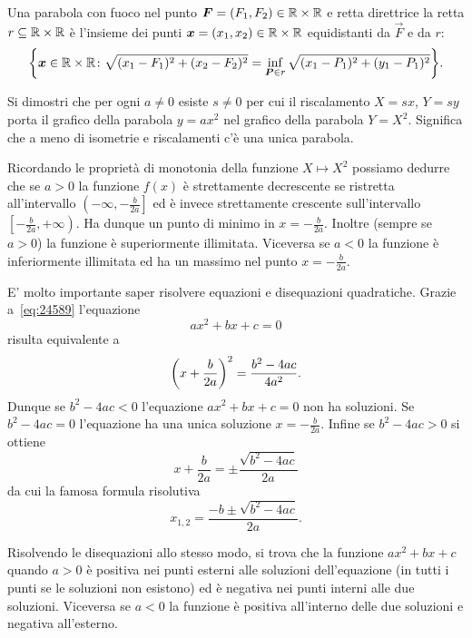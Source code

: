 \begin{definition}[parabola]
  Una parabola con fuoco nel punto $\boldsymbol F=(F_1,F_2)\in {\mathbb R}\times {\mathbb R}$ 
  e retta direttrice 
  la retta $r \subseteq {\mathbb R}\times{\mathbb R}$ 
  è l'insieme dei punti  $\boldsymbol x = (x_1,x_2)\in {\mathbb R}\times{\mathbb R}$ 
  equidistanti da $\vec F$ e da $r$:
  \[
  {\left\{ \boldsymbol x\in {\mathbb R}\times{\mathbb R}\colon 
  \sqrt{(x_1-F_1)^2 + (x_2-F_2)^2} 
  = \inf_{\boldsymbol P\in r}\sqrt{(x_1-P_1)^2+(y_1-P_1)^2}
   \right\}}.
  \]
\end{definition}

\begin{exercise}
  Si dimostri che per ogni $a\neq 0$ esiste $s\neq 0$ 
  per cui il riscalamento $X=sx$, $Y=sy$ porta il grafico della 
  parabola $y=ax^2$ nel grafico della parabola $Y=X^2$.
  Significa che a meno di isometrie e riscalamenti c'è una 
  unica parabola.
\end{exercise}

Ricordando le proprietà di monotonia della funzione $X\mapsto X^2$
possiamo dedurre che se $a>0$ la funzione $f(x)$ è strettamente
decrescente se ristretta all'intervallo 
$\left(-\infty,-\frac b {2a}\right]$ ed è invece strettamente crescente 
sull'intervallo $\left[-\frac b{2a},+\infty\right)$. 
Ha dunque un punto di minimo in $x=-\frac{b}{2a}$.
Inoltre (sempre se $a>0$) la funzione è superiormente illimitata.
Viceversa se $a<0$ la funzione è inferiormente illimitata ed ha 
un massimo nel punto $x=-\frac{b}{2a}$.

E' molto importante saper risolvere equazioni e disequazioni
quadratiche. Grazie a~\eqref{eq:24589} l'equazione
\[
 a x^2 + bx + c = 0
\]
risulta equivalente a
\[
  {\left( x+\frac{b}{2a} \right)}^2 = \frac{b^2-4ac}{4a^2}.
\]
Dunque se $b^2-4ac<0$ l'equazione $ax^2+bx+c=0$ non ha soluzioni.
Se $b^2-4ac=0$ l'equazione ha una unica soluzione $x=-\frac{b}{2a}$.
Infine se $b^2-4ac>0$ si ottiene
\[
  x+\frac b{2a} = \pm \frac{\sqrt{b^2-4ac}}{2a}
\]
da cui la famosa formula risolutiva
\mymark{***}
\begin{equation}\label{eq:secondo_grado}
  x_{1,2} = \frac{-b \pm \sqrt{b^2-4ac}}{2a}.
\end{equation}

Risolvendo le disequazioni allo stesso modo, si trova
che la funzione $ax^2+bx+c$ quando $a>0$ è positiva
nei punti esterni alle soluzioni dell'equazione
(in tutti i punti se le soluzioni non esistono) ed
è negativa nei punti interni alle due soluzioni.
Viceversa se $a<0$ la funzione è positiva all'interno
delle due soluzioni e negativa all'esterno.



